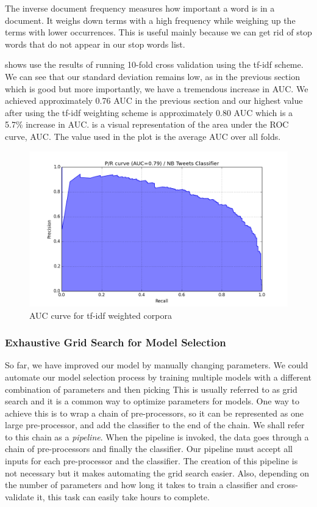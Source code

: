 The inverse document frequency measures how important a word is in a document. It weighs down terms
with a high frequency while weighing up the terms with lower occurrences. This is useful mainly
because we can get rid of stop words that do not appear in our stop words list.

 shows use the results of running 10-fold cross validation using the
tf-idf scheme. We can see that our standard deviation remains low, as in the previous section which
is good but more importantly, we have a tremendous increase in AUC\@. We achieved approximately
0.76 AUC in the previous section and our highest value after using the tf-idf weighting scheme is
approximately 0.80 AUC which is a 5.7\% increase in AUC\@.  is a visual
representation of the area under the ROC curve, AUC\@. The value used in the plot is the average AUC
over all folds.

\begin{figure}
  \includegraphics[width=\linewidth]{Figures/pr_NB_Tweets_Classifier_03}
\caption{AUC curve for tf-idf weighted corpora}
\label{fig:auc-tfidf}
\end{figure}



\subsubsection{Exhaustive Grid Search for Model Selection}
\label{sec:exhaustive-grid-search}
So far, we have improved our model by manually changing parameters. We could automate our model
selection process by training multiple models with a different combination of parameters and then
picking This is usually referred to as grid search and it is a common way to optimize parameters for
models. One way to achieve this is to wrap a chain of pre-processors, so it can be represented as
one large pre-processor, and add the classifier to the end of the chain. We shall refer to this
chain as a \textit{pipeline}. When the pipeline is invoked, the data goes through a chain of
pre-processors and finally the classifier. Our pipeline must accept all inputs for each
pre-processor and the classifier. The creation of this pipeline is not necessary but it makes
automating the grid search easier. Also, depending on the number of parameters and how long it takes
to train a classifier and cross-validate it, this task can easily take hours to complete.

